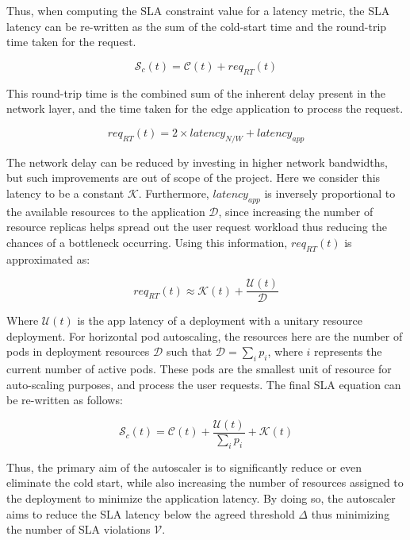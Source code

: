 Thus, when computing the SLA constraint value for a latency metric, the SLA latency can be re-written as the sum of the cold-start time and the round-trip time taken for the request.

\begin{equation}
    \mathcal{S}_{c}(t) = \mathcal{C}(t) + req_{RT}(t)
\end{equation}


This round-trip time is the combined sum of the inherent delay present in the network layer, and the time taken for the edge application to process the request.

\begin{equation}
    req_{RT}(t) = 2 \times latency_{N/W} + latency_{app}
\end{equation}

The network delay can be reduced by investing in higher network bandwidths, but such improvements are out of scope of the project. Here we consider this latency to be a constant $\mathcal{K}$. Furthermore, $latency_{app}$ is inversely proportional to the available resources to the application $\mathcal{D}$, since increasing the number of resource replicas helps spread out the user request workload thus reducing the chances of a bottleneck occurring. Using this information, $req_{RT}(t)$ is approximated as:

\begin{equation}
    req_{RT}(t) \approx \mathcal{K}(t) + \frac{\mathcal{U}(t)}{\mathcal{D}}
\end{equation}

Where $\mathcal{U}(t)$ is the app latency of a deployment with a unitary resource deployment. For horizontal pod autoscaling, the resources here are the number of pods in deployment resources $\mathcal{D}$ such that $\mathcal{D} = \sum_{i} p_{i}$, where $i$ represents the current number of active pods. These pods are the smallest unit of resource for auto-scaling purposes, and process the user requests. The final SLA equation can be re-written as follows:

\begin{equation}
    \mathcal{S}_{c}(t) = \mathcal{C}(t) + \frac{\mathcal{U}(t)}{\sum_{i} p_{i}} + \mathcal{K}(t)
\end{equation}

Thus, the primary aim of the autoscaler is to significantly reduce or even eliminate the cold start, while also increasing the number of resources assigned to the deployment to minimize the application latency. By doing so, the autoscaler aims to reduce the SLA latency below the agreed threshold $\Delta$ thus minimizing the number of SLA violations $\mathcal{V}$.\par

